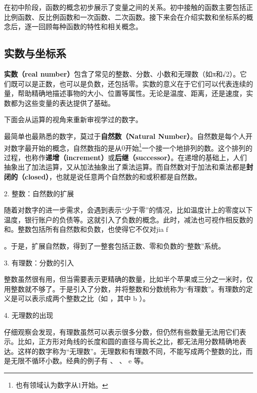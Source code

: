 
\begin{issues}
\issueDraft
\end{issues}

在初中阶段，函数的概念初步展示了变量之间的关系。初中接触的函数主要包括正比例函数、反比例函数和一次函数、二次函数。接下来会在介绍实数和坐标系的概念后，逐一回顾每种函数的特性和相关概念。

\subsection{实数与坐标系}

\textbf{实数（real number）}包含了常见的整数、分数、小数和无理数（如π和√2）。它们既可以是正数，也可以是负数，还包括零。实数的意义在于它们可以代表连续的量，帮助精确地描述事物的大小、位置等属性。无论是温度、距离，还是速度，实数都为这些变量的表达提供了基础。

下面会从运算的视角来重新审视学过的数字。

最简单也最熟悉的数字，莫过于\textbf{自然数（Natural Number）}。自然数是每个人开对数字最开始的概念，自然数指的是从$0$开始\footnote{也有领域认为数字从$1$开始。}一个接一个地排列的数。这个排列的过程，也称作\textbf{递增（increment）}或\textbf{后继（successor）}。在递增的基础上，人们抽象出了加法运算，又从加法抽象出了乘法运算。而自然数对于加法和乘法都是\textbf{封闭的（closed）}，也就是说任意两个自然数的和或积都是自然数。

2. 整数：自然数的扩展

随着对数字的进一步需求，会遇到表示“少于零”的情况，比如温度计上的零度以下温度，银行账户的负债等。这就引入了负数的概念。此时，减法也可视作相反数的和。整数包括所有自然数和负数，也使得它不仅对jia f

。于是，扩展自然数，得到了一整套包括正数、零和负数的“整数”系统。

3. 有理数：分数的引入

整数虽然很有用，但当需要表示更精确的数量，比如半个苹果或三分之一米时，仅用整数就不够了。于是引入了分数，并将整数和分数统称为“有理数”。有理数的定义是可以表示成两个整数之比（如   ，其中 b  ）。

4. 无理数的出现

仔细观察会发现，有理数虽然可以表示很多分数，但仍然有些数量无法用它们表示。比如，正方形对角线的长度和圆的直径与周长之比，都无法用分数精确地表达。这样的数字称为“无理数”。无理数和有理数不同，不能写成两个整数的比，而是无限不循环小数。经典的例子有  、 \pi 、 e 等。

